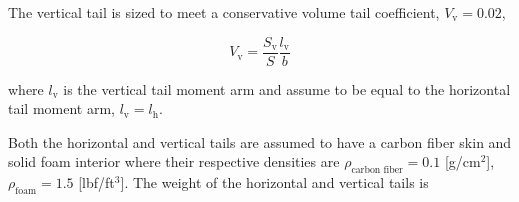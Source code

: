 \documentclass[]{aiaa-tc}%
\begin{document}
% 
% 
% 
% 
% 
% 

The vertical tail is sized to meet a conservative volume tail coefficient, $V_{\text{v}}= 0.02$,\cite{aircraftrules}

\begin{equation}
    \label{e:vtv}
    V_{\text{v}} = \frac{S_{\text{v}}}{S} \frac{l_{\text{v}}}{b}
\end{equation}

where $l_{\text{v}}$ is the vertical tail moment arm and assume to be equal to the horizontal tail moment arm, $l_{\text{v}} = l_{\text{h}}$.

Both the horizontal and vertical tails are assumed to have a carbon fiber skin and solid foam interior where their respective densities are $\rho_{\text{carbon fiber}} = 0.1$ [g/cm$^2$], $\rho_{\text{foam}} = 1.5$ [lbf/ft$^3$]. 
The weight of the horizontal and vertical tails is
\end{document}
